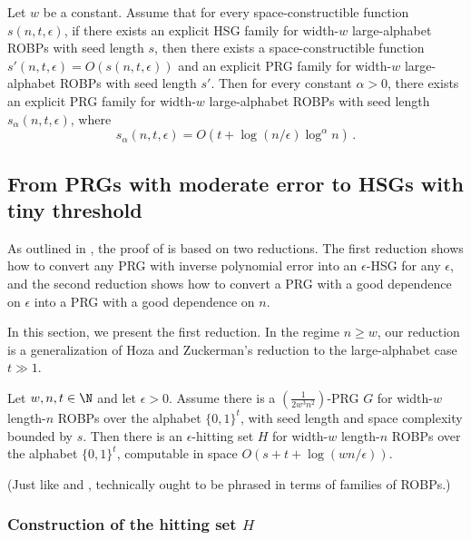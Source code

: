 \begin{theorem} \label{thm:negative}
Let $w$ be a constant. Assume that for every space-constructible function $s(n, t, \epsilon)$, if there exists an explicit HSG family for width-$w$ large-alphabet ROBPs with seed length $s$, then there exists a space-constructible function $s'(n, t, \epsilon) = O(s(n, t, \epsilon))$ and an explicit PRG family for width-$w$ large-alphabet ROBPs with seed length $s'$. Then for every constant $\alpha > 0$, there exists an explicit PRG family for width-$w$ large-alphabet ROBPs with seed length $s_\alpha(n, t, \epsilon)$, where
$$
s_{\alpha}(n, t, \epsilon) = O(t + \log(n/\epsilon) \log^\alpha n)\,.
$$
\end{theorem}

\subsection{From PRGs with moderate error to HSGs with tiny threshold}

As outlined in , the proof of  is based on two reductions. The first reduction shows how to convert any PRG with inverse polynomial error into an $\epsilon$-HSG for any $\epsilon$, and the second reduction shows how to convert a PRG with a good dependence on $\epsilon$ into a PRG with a good dependence on $n$.

In this section, we present the first reduction. In the regime $n \geq w$, our reduction is a generalization of Hoza and Zuckerman's reduction \cite{HZ20} to the large-alphabet case $t \gg 1$.

\begin{theorem} \label{thm:large-alphabet-hz}
Let $w, n, t \in \N$ and let $\epsilon > 0$. Assume there is a $(\frac{1}{2w^3 n^2})$-PRG $G$ for width-$w$ length-$n$ ROBPs over the alphabet $\{0, 1\}^t$, with seed length and space complexity bounded by $s$. Then there is an $\epsilon$-hitting set $H$ for width-$w$ length-$n$ ROBPs over the alphabet $\{0, 1\}^t$, computable in space $O(s + t + \log(wn/\epsilon))$.
\end{theorem}

(Just like  and ,  technically ought to be phrased in terms of families of ROBPs.)

\subsubsection{Construction of the hitting set $H$}


